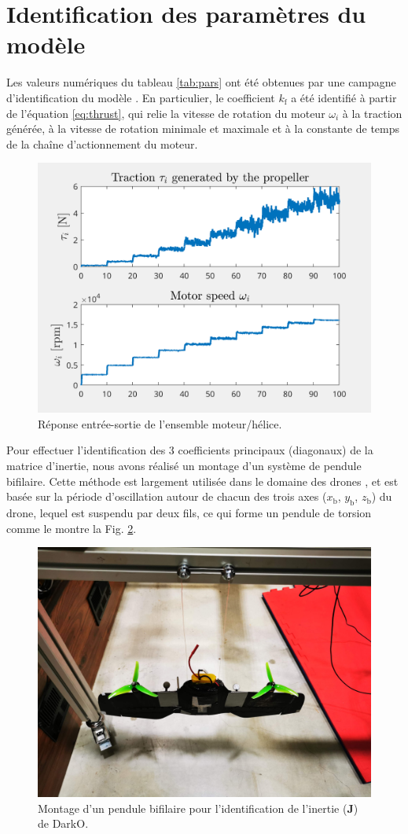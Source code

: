 \section{Identification des paramètres du modèle}
    Les valeurs numériques du tableau \ref{tab:pars} ont été obtenues par une campagne d'identification du modèle \cite{sansouStage}. En particulier, le coefficient $k_{\text{f}}$ a été identifié à partir de l'équation \eqref{eq:thrust}, qui relie la vitesse de rotation du moteur $\omega_{i}$ à la traction générée, à la vitesse de rotation minimale et maximale et à la constante de temps de la chaîne d'actionnement du moteur.
    \begin{figure}[ht!]
        \centerline{
        \includegraphics[trim=0cm 0cm 0cm 0cm,clip,width=0.5\columnwidth]{figures/ident_motor March 27 2024 1651.png}}
        \caption{Réponse entrée-sortie de l'ensemble moteur/hélice.}
        \label{fig:IOmot}
    \end{figure}
    
    Pour effectuer l'identification des 3 coefficients principaux (diagonaux) de la matrice d'inertie, nous avons réalisé un montage d'un système de pendule bifilaire. Cette méthode est largement utilisée dans le domaine des drones \cite{Jardin2007OptimizedMO}, et est basée sur la période d'oscillation autour de chacun des trois axes ($x_{{\text{b}}}$, $y_{\text{b}}$, $z_{\text{b}}$) du drone, lequel est suspendu par deux fils, ce qui forme un pendule de torsion comme le montre la Fig. \ref{fig:BifilarPend}.

    \begin{figure}[ht!]
        \centerline{
        \includegraphics[trim=20cm 15cm 23cm 0cm,clip,width=0.4\columnwidth]{figures/IMG_20230609_085023.jpg}}
        \caption{Montage d'un pendule bifilaire pour l'identification de l'inertie ($\boldsymbol{J}$) de DarkO.}
        \label{fig:BifilarPend}
    \end{figure}


